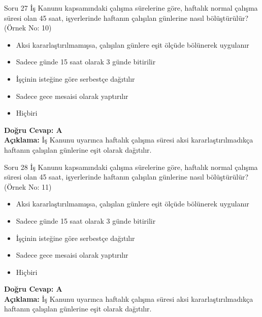 \documentclass[12pt,a4paper]{article}
\begin{document}
\begin{testcard}{Soru 27}
    İş Kanunu kapsamındaki çalışma sürelerine göre, haftalık normal çalışma süresi olan 45 saat, işyerlerinde haftanın çalışılan günlerine nasıl bölüştürülür? (Örnek No: 10)
    \begin{itemize}
        \item[A)] Aksi kararlaştırılmamışsa, çalışılan günlere eşit ölçüde bölünerek uygulanır
        \item[B)] Sadece günde 15 saat olarak 3 günde bitirilir
        \item[C)] İşçinin isteğine göre serbestçe dağıtılır
        \item[D)] Sadece gece mesaisi olarak yaptırılır
        \item[E)] Hiçbiri
    \end{itemize}
    \tcblower
    \textbf{Doğru Cevap: A} \\
    \textbf{Açıklama:} İş Kanunu uyarınca haftalık çalışma süresi aksi kararlaştırılmadıkça haftanın çalışılan günlerine eşit olarak dağıtılır.
\end{testcard}

\begin{testcard}{Soru 28}
    İş Kanunu kapsamındaki çalışma sürelerine göre, haftalık normal çalışma süresi olan 45 saat, işyerlerinde haftanın çalışılan günlerine nasıl bölüştürülür? (Örnek No: 11)
    \begin{itemize}
        \item[A)] Aksi kararlaştırılmamışsa, çalışılan günlere eşit ölçüde bölünerek uygulanır
        \item[B)] Sadece günde 15 saat olarak 3 günde bitirilir
        \item[C)] İşçinin isteğine göre serbestçe dağıtılır
        \item[D)] Sadece gece mesaisi olarak yaptırılır
        \item[E)] Hiçbiri
    \end{itemize}
    \tcblower
    \textbf{Doğru Cevap: A} \\
    \textbf{Açıklama:} İş Kanunu uyarınca haftalık çalışma süresi aksi kararlaştırılmadıkça haftanın çalışılan günlerine eşit olarak dağıtılır.
\end{testcard}
\end{document}
